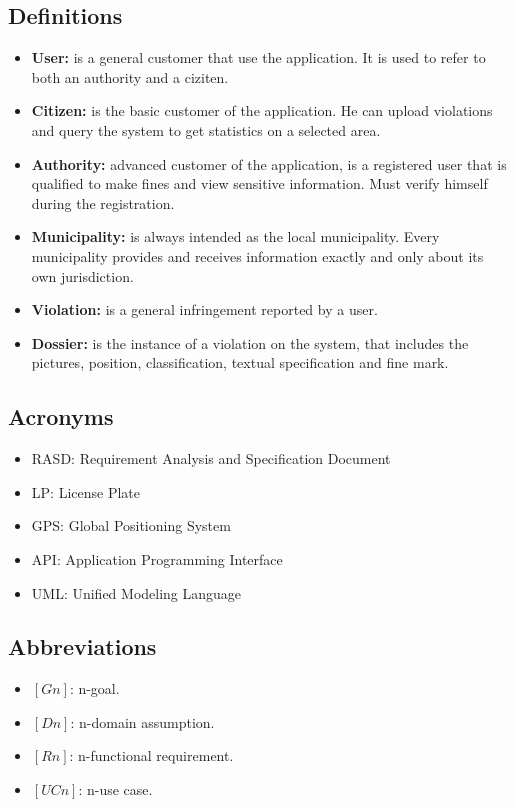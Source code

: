 \documentclass[../RASD.tex]{subfiles}
\begin{document}
        \subsection{Definitions}\label{subsec:definitions}
        \begin{itemize}
            \item \textbf{User:} is a general customer that use the application. It is used to refer to both an authority and a ciziten.
            \item \textbf{Citizen:} is the basic customer of the application. He can upload violations and query the system to get statistics on a selected area.
            \item \textbf{Authority:} advanced customer of the application, is a registered user that is qualified to make fines and view sensitive information. Must verify himself during the registration.
            \item \textbf{Municipality:} is always intended as the local municipality. Every municipality provides and receives information exactly and only about its own jurisdiction.
            \item \textbf{Violation:} is a general infringement reported by a user.
            \item  \textbf{Dossier:} is the instance of a violation on the system, that includes the pictures, position, classification, textual specification and fine mark.
        \end{itemize}

        \subsection{Acronyms}\label{subsec:acronyms}
        \begin{itemize}
            \item RASD: Requirement Analysis and Specification Document
            \item LP: License Plate
            \item GPS: Global Positioning System
            \item API: Application Programming Interface
            \item UML: Unified Modeling Language
        \end{itemize}

        \subsection{Abbreviations}\label{subsec:abbreviations}
        \begin{itemize}
            \item $[Gn]$: n-goal.
            \item $[Dn]$: n-domain assumption.
            \item $[Rn]$: n-functional requirement.
            \item $[UCn]$: n-use case.
        \end{itemize}
\end{document}
